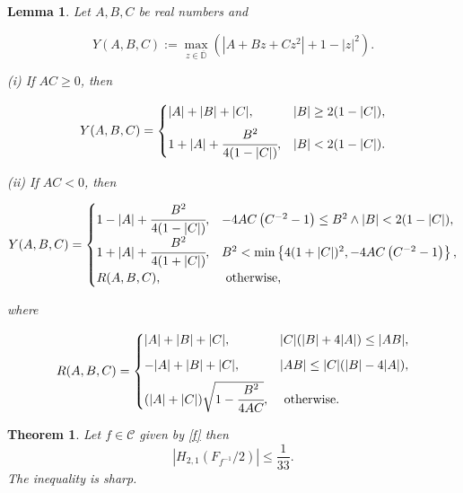\documentclass[10pt,a4paper]{amsart}
\newtheorem{lemma}{Lemma}
\newtheorem{theorem}{Theorem}
\begin{document}
\begin{lemma}\label{y(a,b,c)}
Let $A, B, C$ be real numbers and

$$
Y(A, B, C):=\max _{z \in \overline{\mathbb{D}}}\left(\left|A+B z+C z^{2}\right|+1-|z|^{2}\right) .
$$

(i) If $A C \geq 0$, then

$$
Y(A, B, C)= \begin{cases}|A|+|B|+|C|, & |B| \geq 2(1-|C|), \\[2mm] 1+|A|+\cfrac{B^{2}}{4(1-|C|)}, & |B|<2(1-|C|) .\end{cases}
$$

(ii) If $A C<0$, then

$$
Y(A, B, C)= \begin{cases}1-|A|+\cfrac{B^{2}}{4(1-|C|)}, & -4 A C\left(C^{-2}-1\right) \leq B^{2} \wedge|B|<2(1-|C|), \\[2mm] 1+|A|+\cfrac{B^{2}}{4(1+|C|)}, & B^{2}<\min \left\{4(1+|C|)^{2},-4 A C\left(C^{-2}-1\right)\right\}, \\[2mm] R(A, B, C), & \text { otherwise, }\end{cases}
$$

where

$$
R(A, B, C)= \begin{cases}|A|+|B|+|C|, & |C|(|B|+4|A|) \leq|A B|, \\[2mm] -|A|+|B|+|C|, & |A B| \leq|C|(|B|-4|A|), \\[2mm] (|A|+|C|) \sqrt{1-\cfrac{B^{2}}{4 A C}}, & \text { otherwise. }\end{cases}
$$
\end{lemma}

\begin{theorem}
Let $f\in\mathcal{C}$ given by \eqref{f} then
\begin{equation}\label{thm1}
	|H_{2,1}(F_{f^{-1}}/2)| \leq \frac{1}{33}.
\end{equation}
	The inequality is sharp.

\end{theorem}
\end{document}
